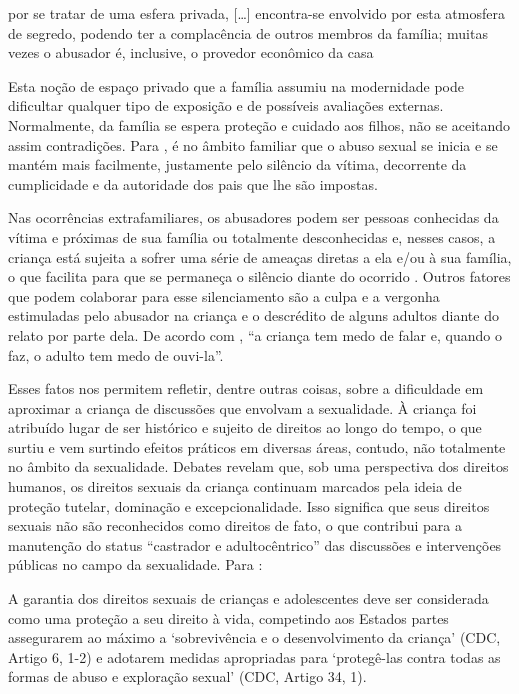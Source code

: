 
\begin{citacao}
	por se tratar de uma esfera privada, [\ldots] encontra-se envolvido por esta atmosfera de segredo, podendo ter a complacência de outros membros da família; muitas vezes o abusador é, inclusive, o provedor econômico da casa \cite[p. 9]{JUNG2006}
\end{citacao}

Esta noção de espaço privado que a família assumiu na modernidade pode dificultar qualquer tipo de exposição e de possíveis avaliações externas. Normalmente, da família se espera proteção e cuidado aos filhos, não se aceitando assim contradições. Para , é no âmbito familiar que o abuso sexual se inicia e se mantém mais facilmente, justamente pelo silêncio da vítima, decorrente da cumplicidade e da autoridade dos pais que lhe são impostas. 

Nas ocorrências extrafamiliares, os abusadores podem ser pessoas conhecidas da vítima e próximas de sua família ou totalmente desconhecidas e, nesses casos, a criança está sujeita a sofrer uma série de ameaças diretas a ela e/ou à sua família, o que facilita para que se permaneça o silêncio diante do ocorrido \cite{JUNG2006}. Outros fatores que podem colaborar para esse silenciamento são a culpa e a vergonha estimuladas pelo abusador na criança e o descrédito de alguns adultos diante do relato por parte dela. De acordo com , ``a criança tem medo de falar e, quando o faz, o adulto tem medo de ouvi-la''. 

Esses fatos nos permitem refletir, dentre outras coisas, sobre a dificuldade em aproximar a criança de discussões que envolvam a sexualidade. À criança foi atribuído lugar de ser histórico e sujeito de direitos ao longo do tempo, o que surtiu e vem surtindo efeitos práticos em diversas áreas, contudo, não totalmente no âmbito da sexualidade. Debates revelam que, sob uma perspectiva dos direitos humanos, os direitos sexuais da criança continuam marcados pela ideia de proteção tutelar, dominação e excepcionalidade. Isso significa que seus direitos sexuais não são reconhecidos como direitos de fato, o que contribui para a manutenção do status ``castrador e adultocêntrico'' das discussões e intervenções públicas no campo da sexualidade. Para :

\begin{citacao}
	A garantia dos direitos sexuais de crianças e adolescentes deve ser considerada como uma proteção a seu direito à vida, competindo aos Estados partes assegurarem ao máximo a `sobrevivência e o desenvolvimento da criança' (CDC\footnotemark, Artigo 6, 1-2) e adotarem medidas apropriadas para `protegê-las contra todas as formas de abuso e exploração sexual' (CDC, Artigo 34, 1).
\end{citacao}

